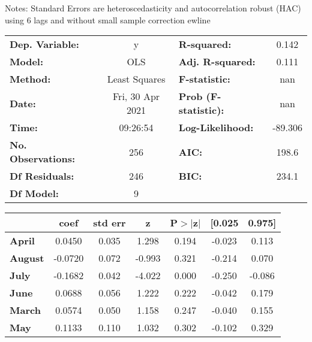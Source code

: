 Notes: \newline
 [1] Standard Errors are heteroscedasticity and autocorrelation robust (HAC) using 6 lags and without small sample correction
ewline\begin{center}
\begin{tabular}{lclc}
\toprule
\textbf{Dep. Variable:}    &        y         & \textbf{  R-squared:         } &     0.142   \\
\textbf{Model:}            &       OLS        & \textbf{  Adj. R-squared:    } &     0.111   \\
\textbf{Method:}           &  Least Squares   & \textbf{  F-statistic:       } &       nan   \\
\textbf{Date:}             & Fri, 30 Apr 2021 & \textbf{  Prob (F-statistic):} &      nan    \\
\textbf{Time:}             &     09:26:54     & \textbf{  Log-Likelihood:    } &   -89.306   \\
\textbf{No. Observations:} &         256      & \textbf{  AIC:               } &     198.6   \\
\textbf{Df Residuals:}     &         246      & \textbf{  BIC:               } &     234.1   \\
\textbf{Df Model:}         &           9      & \textbf{                     } &             \\
\bottomrule
\end{tabular}
\begin{tabular}{lcccccc}
                   & \textbf{coef} & \textbf{std err} & \textbf{z} & \textbf{P$> |$z$|$} & \textbf{[0.025} & \textbf{0.975]}  \\
\midrule
\textbf{April}     &       0.0450  &        0.035     &     1.298  &         0.194        &       -0.023    &        0.113     \\
\textbf{August}    &      -0.0720  &        0.072     &    -0.993  &         0.321        &       -0.214    &        0.070     \\
\textbf{July}      &      -0.1682  &        0.042     &    -4.022  &         0.000        &       -0.250    &       -0.086     \\
\textbf{June}      &       0.0688  &        0.056     &     1.222  &         0.222        &       -0.042    &        0.179     \\
\textbf{March}     &       0.0574  &        0.050     &     1.158  &         0.247        &       -0.040    &        0.155     \\
\textbf{May}       &       0.1133  &        0.110     &     1.032  &         0.302        &       -0.102    &        0.329     \\

\end{tabular}
\end{center}
